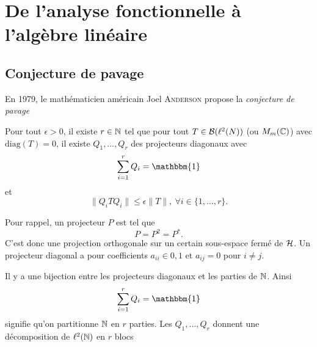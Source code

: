 
\chapter{De l'analyse fonctionnelle à l'algèbre linéaire}
\label{sec:chap2}


\section{Conjecture de pavage}
\label{sec:conjecture-de-pavage}

En 1979, le mathématicien américain Joel \textsc{Anderson} propose la \emph{conjecture de pavage}

\begin{conj}
  Pour tout $\epsilon > 0$, il existe $r \in \mathbb{N}$ tel que pour tout $T \in \mathcal{B}(\ell^2(N))$ (ou $M_m(\mathbb{C})$) avec
  $\mathrm{diag}(T) = 0$, il existe $Q_1, \ldots, Q_r$ des projecteurs diagonaux avec 
  \[ \sum_{i=1}^{r} Q_i = \mathbbm{1} \]
  et 
  \[ \|Q_iTQ_i\|  \leq \epsilon \|T\|, \ \forall i \in \{1, \ldots, r\}. \]
\end{conj}

Pour rappel, un projecteur $P$ est tel que 
\[ P = P^2 = P^\ast. \]
C'est donc une projection orthogonale sur un certain sous-espace fermé de $\mathcal{H}$. Un projecteur diagonal a pour coefficients $a_{ii} \in {0, 1}$ et $a_{ij} = 0$ pour $i \neq j$.

Il y a une bijection entre les projecteurs diagonaux et les parties de $\mathbb{N}$. Ainsi 
\[ \sum_{i = 1}^{r} Q_i = \mathbbm{1} \]
signifie qu'on partitionne $\mathbb{N}$ en $r$ parties. Les $Q_1, \ldots, Q_r$ donnent une décomposition de
$\ell^2(\mathbb{N})$ en $r$ blocs

\begin{center}
\end{center}

